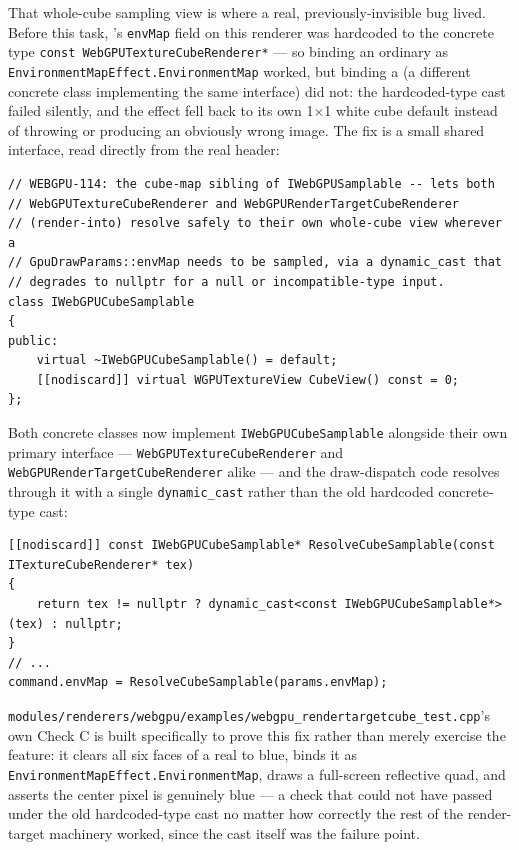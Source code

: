 That whole-cube sampling view is where a real, previously-invisible bug lived. Before this
task, 's \texttt{envMap} field on this renderer was hardcoded to
the concrete type \texttt{const WebGPUTextureCubeRenderer*} --- so binding an ordinary
 as \texttt{EnvironmentMapEffect.EnvironmentMap} worked, but
binding a  (a different concrete class implementing the same
 interface) did not: the hardcoded-type cast failed silently,
and the effect fell back to its own 1$\times$1 white cube default instead of throwing or
producing an obviously wrong image. The fix is a small shared interface, read directly from
the real header:

\begin{lstlisting}
// WEBGPU-114: the cube-map sibling of IWebGPUSamplable -- lets both
// WebGPUTextureCubeRenderer and WebGPURenderTargetCubeRenderer
// (render-into) resolve safely to their own whole-cube view wherever a
// GpuDrawParams::envMap needs to be sampled, via a dynamic_cast that
// degrades to nullptr for a null or incompatible-type input.
class IWebGPUCubeSamplable
{
public:
    virtual ~IWebGPUCubeSamplable() = default;
    [[nodiscard]] virtual WGPUTextureView CubeView() const = 0;
};
\end{lstlisting}

Both concrete classes now implement \texttt{IWebGPUCubeSamplable} alongside their own primary
interface --- \texttt{WebGPUTextureCubeRenderer} and \texttt{WebGPURenderTargetCubeRenderer}
alike --- and the draw-dispatch code resolves through it with a single \texttt{dynamic\_cast}
rather than the old hardcoded
concrete-type cast:

\begin{lstlisting}
[[nodiscard]] const IWebGPUCubeSamplable* ResolveCubeSamplable(const ITextureCubeRenderer* tex)
{
    return tex != nullptr ? dynamic_cast<const IWebGPUCubeSamplable*>(tex) : nullptr;
}
// ...
command.envMap = ResolveCubeSamplable(params.envMap);
\end{lstlisting}

\texttt{modules/renderers/webgpu/examples/\allowbreak{}webgpu\_rendertargetcube\_test.cpp}'s own Check C is built specifically to
prove this fix rather than merely exercise the feature: it clears all six faces of a real
 to blue, binds it as \texttt{EnvironmentMapEffect.EnvironmentMap},
draws a full-screen reflective quad, and asserts the center pixel is genuinely blue --- a check
that could not have passed under the old hardcoded-type cast no matter how correctly the rest
of the render-target machinery worked, since the cast itself was the failure point.

